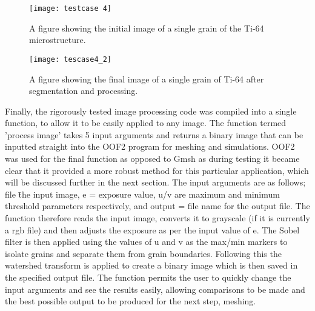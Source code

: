 \documentclass[\report.tex]{subfiles}
\begin{document}
\begin{figure}
  \centering
  \begin{minipage}[!htb]{.5\textwidth}
    \centering\captionsetup{width=.8\linewidth}%
    \texttt{[image: testcase 4]}
    \caption{A figure showing the initial image of a single grain of the Ti-64 microstructure.}\label{fig:Ti64single}
  \end{minipage}%
  \begin{minipage}[!htb]{.5\textwidth}
    \centering\captionsetup{width=.8\linewidth}%
    \texttt{[image: tescase4\_2]}
    \caption{A figure showing the final image of a single grain of Ti-64 after segmentation and processing.}\label{fig:Ti64single2}
  \end{minipage}
\end{figure}

\noindent Finally, the rigorously tested image processing code was compiled into a single function, to allow it to be easily applied to any image. The function termed 'process image' takes 5 input arguments and returns a binary image that can be inputted straight into the OOF2 program for meshing and simulations. OOF2 was used for the final function as opposed to Gmsh as during testing it became clear that it provided a more robust method for this particular application, which will be discussed further in the next section. The input arguments are as follows; file \= the input image, e = exposure value, u/v are maximum and minimum threshold parameters respectively, and output = file name for the output file. The function therefore reads the input image, converts it to grayscale (if it is currently a rgb file) and then adjusts the exposure as per the input value of e. The Sobel filter is then applied using the values of u and v as the max/min markers to isolate grains and separate them from grain boundaries. Following this the watershed transform is applied to create a binary image which is then saved in the specified output file. The function permits the user to quickly change the input arguments and see the results easily, allowing comparisons to be made and the best possible output to be produced for the next step, meshing.
\end{document}

